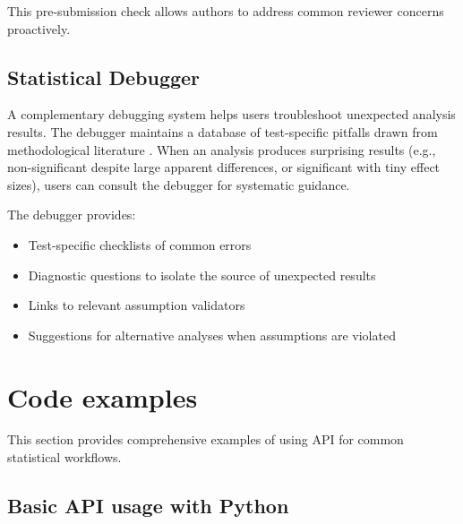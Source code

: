 \documentclass[article]{jss}
\begin{document}
This pre-submission check allows authors to address common reviewer concerns proactively.

\subsection{Statistical Debugger}

A complementary debugging system helps users troubleshoot unexpected analysis results. The debugger maintains a database of test-specific pitfalls drawn from methodological literature \citep{keselman1998statistical, zimmerman2004note, osborne2010improving}. When an analysis produces surprising results (e.g., non-significant despite large apparent differences, or significant with tiny effect sizes), users can consult the debugger for systematic guidance.

The debugger provides:
\begin{itemize}
\item Test-specific checklists of common errors
\item Diagnostic questions to isolate the source of unexpected results
\item Links to relevant assumption validators
\item Suggestions for alternative analyses when assumptions are violated
\end{itemize}


\section{Code examples} \label{sec:code}

This section provides comprehensive examples of using  API for common statistical workflows.

\subsection{Basic API usage with Python}
\end{document}
